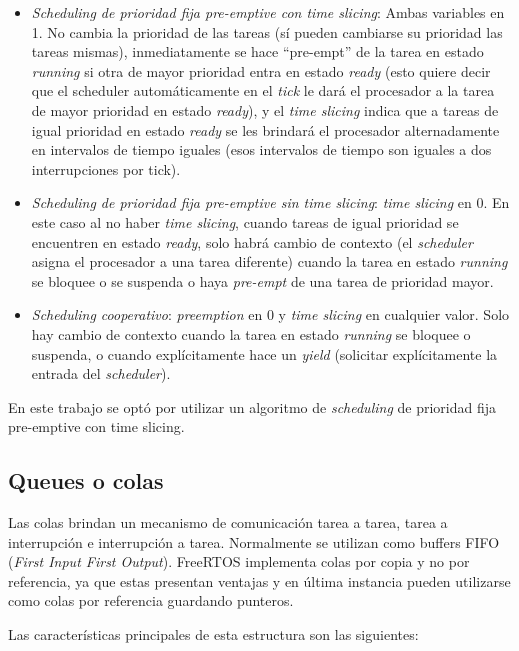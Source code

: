 \documentclass{IEEEtran}
\begin{document}
\begin{itemize}
    \item \textit{Scheduling de prioridad fija pre-emptive con time slicing}: Ambas variables en 1. No cambia la prioridad de las tareas (sí pueden cambiarse su prioridad las tareas mismas), inmediatamente se hace ``pre-empt'' de la tarea en estado \textit{running} si otra de mayor prioridad entra en estado \textit{ready} (esto quiere decir que el scheduler automáticamente en el \textit{tick} le dará el procesador a la tarea de mayor prioridad en estado \textit{ready}), y el \textit{time slicing} indica que a tareas de igual prioridad en estado \textit{ready} se les brindará el procesador alternadamente en intervalos de tiempo iguales (esos intervalos de tiempo son iguales a dos interrupciones por tick).
    \item \textit{Scheduling de prioridad fija pre-emptive sin time slicing}: \textit{time slicing} en 0. En este caso al no haber \textit{time slicing}, cuando tareas de igual prioridad se encuentren en estado \textit{ready}, solo habrá cambio de contexto (el \textit{scheduler} asigna el procesador a una tarea diferente) cuando la tarea en estado \textit{running} se bloquee o se suspenda o haya \textit{pre-empt} de una tarea de prioridad mayor.
    \item \textit{Scheduling cooperativo}: \textit{preemption} en 0 y \textit{time slicing} en cualquier valor. Solo hay cambio de contexto cuando la tarea en estado \textit{running} se bloquee o suspenda, o cuando explícitamente hace un \textit{yield} (solicitar explícitamente la entrada del \textit{scheduler}).
\end{itemize}

En este trabajo se optó por utilizar un algoritmo de \textit{scheduling} de prioridad fija pre-emptive con time slicing.

\subsection{Queues o colas}
Las colas brindan un mecanismo de comunicación tarea a tarea, tarea a interrupción e interrupción a tarea. Normalmente se utilizan como buffers FIFO (\textit{First Input First Output}). FreeRTOS implementa colas por copia y no por referencia, ya que estas presentan ventajas y en última instancia pueden utilizarse como colas por referencia guardando punteros.

Las características principales de esta estructura son las siguientes:
\end{document}
